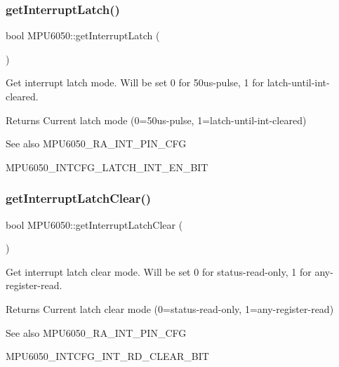\subsubsection{\texorpdfstring{getInterruptLatch()}{getInterruptLatch()}}
{\footnotesize\ttfamily bool M\+P\+U6050\+::get\+Interrupt\+Latch (\begin{DoxyParamCaption}{ }\end{DoxyParamCaption})}

Get interrupt latch mode. Will be set 0 for 50us-\/pulse, 1 for latch-\/until-\/int-\/cleared. \begin{DoxyReturn}{Returns}
Current latch mode (0=50us-\/pulse, 1=latch-\/until-\/int-\/cleared) 
\end{DoxyReturn}
\begin{DoxySeeAlso}{See also}
M\+P\+U6050\+\_\+\+R\+A\+\_\+\+I\+N\+T\+\_\+\+P\+I\+N\+\_\+\+C\+FG 

M\+P\+U6050\+\_\+\+I\+N\+T\+C\+F\+G\+\_\+\+L\+A\+T\+C\+H\+\_\+\+I\+N\+T\+\_\+\+E\+N\+\_\+\+B\+IT 
\end{DoxySeeAlso}
\mbox{\label{class_m_p_u6050_a9a098a607e20c64b60e155da35b8264f}} 
\subsubsection{\texorpdfstring{getInterruptLatchClear()}{getInterruptLatchClear()}}
{\footnotesize\ttfamily bool M\+P\+U6050\+::get\+Interrupt\+Latch\+Clear (\begin{DoxyParamCaption}{ }\end{DoxyParamCaption})}

Get interrupt latch clear mode. Will be set 0 for status-\/read-\/only, 1 for any-\/register-\/read. \begin{DoxyReturn}{Returns}
Current latch clear mode (0=status-\/read-\/only, 1=any-\/register-\/read) 
\end{DoxyReturn}
\begin{DoxySeeAlso}{See also}
M\+P\+U6050\+\_\+\+R\+A\+\_\+\+I\+N\+T\+\_\+\+P\+I\+N\+\_\+\+C\+FG 

M\+P\+U6050\+\_\+\+I\+N\+T\+C\+F\+G\+\_\+\+I\+N\+T\+\_\+\+R\+D\+\_\+\+C\+L\+E\+A\+R\+\_\+\+B\+IT 
\end{DoxySeeAlso}
\mbox{\label{class_m_p_u6050_a58da1dfb39eb34e3a09a9b0bf4d87f29}} 

